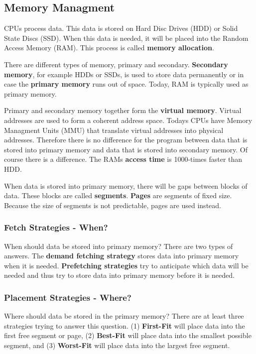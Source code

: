 
\subsection{Memory Managment}

CPUs process data. This data is stored on Hard Disc Drives (HDD) or Solid State Discs (SSD). When this data is needed, it will be placed into the Random Access Memory (RAM). This process is called \textbf{memory allocation}.

There are different types of memory, primary and secondary. {\bf Secondary memory}, for example HDDs or SSDs, is used to store data permanently or in case the {\bf primary memory} runs out of space. Today, RAM is typically used as primary memory.

Primary and secondary memory together form the {\bf virtual memory}. Virtual addresses are used to form a coherent address space. Todays CPUs have Memory Managment Units (MMU) that translate virtual addresses into physical addresses. Therefore there is no difference for the program between data that is stored into primary memory and data that is stored into secondary memory. Of course there is a difference. The RAMs {\bf access time} is 1000-times faster than HDD.

When data is stored into primary memory, there will be gaps between blocks of data. These blocks are called \textbf{segments}. \textbf{Pages} are segments of fixed size. Because the size of segments is not predictable, pages are used instead.

\subsubsection{Fetch Strategies - When?}
When should data be stored into primary memory? There are two types of answers. The \textbf{demand fetching strategy} stores data into primary memory when it is needed. \textbf{Prefetching strategies} try to anticipate which data will be needed and thus try to store data into primary memory before it is needed.

\subsubsection{Placement Strategies - Where?}
Where should data be stored in the primary memory? There are at least three strategies trying to answer this question. (1) \textbf{First-Fit} will place data into the first free segment or page, (2) \textbf{Best-Fit} will place data into the smallest possible segment, and (3) \textbf{Worst-Fit} will place data into the largest free segment.

